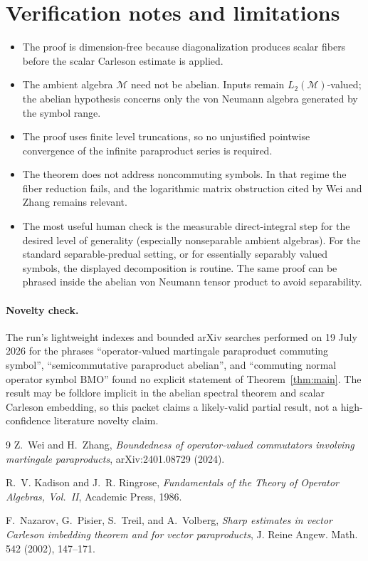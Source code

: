 \documentclass[11pt]{article}
\newcommand{\M}{\mathcal M}
\begin{document}
\section{Verification notes and limitations}

\begin{itemize}
\item The proof is dimension-free because diagonalization produces scalar
fibers before the scalar Carleson estimate is applied.
\item The ambient algebra $\M$ need not be abelian.  Inputs remain
$L_2(\M)$-valued; the abelian hypothesis concerns only the von Neumann algebra
generated by the symbol range.
\item The proof uses finite level truncations, so no unjustified pointwise
convergence of the infinite paraproduct series is required.
\item The theorem does not address noncommuting symbols.  In that regime the
fiber reduction fails, and the logarithmic matrix obstruction cited by Wei
and Zhang remains relevant.
\item The most useful human check is the measurable direct-integral step for
the desired level of generality (especially nonseparable ambient algebras).
For the standard separable-predual setting, or for essentially separably
valued symbols, the displayed decomposition is routine.  The same proof can
be phrased inside the abelian von Neumann tensor product to avoid separability.
\end{itemize}

\paragraph{Novelty check.}
The run's lightweight indexes and bounded arXiv searches performed on
19 July 2026 for the phrases ``operator-valued martingale paraproduct commuting
symbol'', ``semicommutative paraproduct abelian'', and ``commuting normal
operator symbol BMO'' found no explicit statement of Theorem~\ref{thm:main}.
The result may be folklore implicit in the abelian spectral theorem and scalar
Carleson embedding, so this packet claims a likely-valid partial result, not a
high-confidence literature novelty claim.

\begin{thebibliography}{9}
Z.~Wei and H.~Zhang,
\emph{Boundedness of operator-valued commutators involving martingale
paraproducts}, arXiv:2401.08729 (2024).

R.~V. Kadison and J.~R. Ringrose,
\emph{Fundamentals of the Theory of Operator Algebras, Vol.~II},
Academic Press, 1986.

F.~Nazarov, G.~Pisier, S.~Treil, and A.~Volberg,
\emph{Sharp estimates in vector Carleson imbedding theorem and for vector
paraproducts}, J. Reine Angew. Math. 542 (2002), 147--171.
\end{thebibliography}
\end{document}
